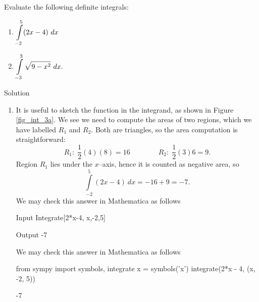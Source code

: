 \begin{example}\label{ex_defint8}
Evaluate the following definite integrals:
\begin{multicols}{2}
\begin{enumerate}
    \item $\ds\int\limits_{-2}^5 (2x-4)\ dx $
    \item $ \ds\int\limits_{-3}^3 \sqrt{9-x^2}\ dx.$
\end{enumerate}
\end{multicols}



Solution 

\begin{enumerate}
		\item		It is useful to sketch the function in the integrand, as shown in Figure \ref{fig_int_3a}. We see we need to compute the areas of two regions, which we have labelled $R_1$ and $R_2$. Both are triangles, so the area computation is straightforward:
			$$R_1:\; \frac12(4)(8) = 16 \qquad \qquad R_2:\; \frac12(3)6 = 9.$$ 
Region $R_1$ lies under the $x$--axis, hence it is counted as negative area, so $$\int\limits_{-2}^5(2x-4)\ dx = -16+9 = -7.$$
\ifmathematica
We may check this answer in Mathematica as follows
	\begin{mdframed}[default,backgroundcolor=gray!40,roundcorner=8pt]
\begin{mmaCell}[morefunctionlocal={x}]{Input}
  Integrate[2*x-4, {x,-2,5}]
\end{mmaCell}

\begin{mmaCell}{Output}
   -7
\end{mmaCell}
\end{mdframed}
\fi
\ifpython
We may check this answer in Mathematica as follows
\begin{pyin}
from sympy import symbols, integrate
x = symbols('x')
integrate(2*x - 4, (x, -2, 5))
\end{pyin}
\begin{pyout}
-7
\end{pyout}
\fi


\end{enumerate}
\end{example}
